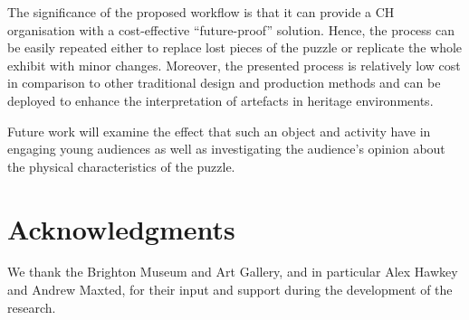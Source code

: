 \documentclass[acmlarge,screen,dvipsnames]{acmart}
\begin{document}
The significance of the proposed workflow is that it can provide a CH
organisation with a cost-effective ``future-proof'' solution. Hence,
the process can be easily repeated either to replace lost pieces of
the puzzle or replicate the whole exhibit with minor
changes. Moreover, the presented process is relatively low cost in
comparison to other traditional design and production methods and can
be deployed to enhance the interpretation of artefacts in heritage
environments.

Future work will examine the effect that such an object and activity
have in engaging young audiences as well as investigating the
audience's opinion about the physical characteristics of the puzzle.

\section{Acknowledgments}

We thank the Brighton Museum and Art Gallery, and in particular Alex
Hawkey and Andrew Maxted, for their input and support during the
development of the research.

%


\end{document}
